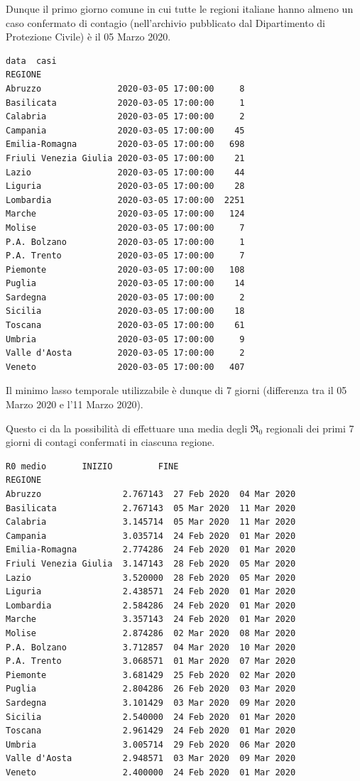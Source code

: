\documentclass[11pt]{article}
\begin{document}
    Dunque il primo giorno comune in cui tutte le regioni italiane hanno
almeno un caso confermato di contagio (nell'archivio pubblicato dal Dipartimento
di Protezione Civile) è il 05 Marzo 2020.

    
    \begin{Verbatim}[commandchars=\\\{\}]
                                     data  casi
REGIONE
Abruzzo               2020-03-05 17:00:00     8
Basilicata            2020-03-05 17:00:00     1
Calabria              2020-03-05 17:00:00     2
Campania              2020-03-05 17:00:00    45
Emilia-Romagna        2020-03-05 17:00:00   698
Friuli Venezia Giulia 2020-03-05 17:00:00    21
Lazio                 2020-03-05 17:00:00    44
Liguria               2020-03-05 17:00:00    28
Lombardia             2020-03-05 17:00:00  2251
Marche                2020-03-05 17:00:00   124
Molise                2020-03-05 17:00:00     7
P.A. Bolzano          2020-03-05 17:00:00     1
P.A. Trento           2020-03-05 17:00:00     7
Piemonte              2020-03-05 17:00:00   108
Puglia                2020-03-05 17:00:00    14
Sardegna              2020-03-05 17:00:00     2
Sicilia               2020-03-05 17:00:00    18
Toscana               2020-03-05 17:00:00    61
Umbria                2020-03-05 17:00:00     9
Valle d'Aosta         2020-03-05 17:00:00     2
Veneto                2020-03-05 17:00:00   407
    \end{Verbatim}

    Il minimo lasso temporale utilizzabile è dunque di 7 giorni (differenza
tra il 05 Marzo 2020 e l'11 Marzo 2020).

    
    Questo ci da la possibilità di effettuare una media degli \(\Re_0\)
regionali dei primi 7 giorni di contagi confermati in ciascuna regione.

    
    \begin{Verbatim}[commandchars=\\\{\}]
                       R0 medio       INIZIO         FINE
REGIONE
Abruzzo                2.767143  27 Feb 2020  04 Mar 2020
Basilicata             2.767143  05 Mar 2020  11 Mar 2020
Calabria               3.145714  05 Mar 2020  11 Mar 2020
Campania               3.035714  24 Feb 2020  01 Mar 2020
Emilia-Romagna         2.774286  24 Feb 2020  01 Mar 2020
Friuli Venezia Giulia  3.147143  28 Feb 2020  05 Mar 2020
Lazio                  3.520000  28 Feb 2020  05 Mar 2020
Liguria                2.438571  24 Feb 2020  01 Mar 2020
Lombardia              2.584286  24 Feb 2020  01 Mar 2020
Marche                 3.357143  24 Feb 2020  01 Mar 2020
Molise                 2.874286  02 Mar 2020  08 Mar 2020
P.A. Bolzano           3.712857  04 Mar 2020  10 Mar 2020
P.A. Trento            3.068571  01 Mar 2020  07 Mar 2020
Piemonte               3.681429  25 Feb 2020  02 Mar 2020
Puglia                 2.804286  26 Feb 2020  03 Mar 2020
Sardegna               3.101429  03 Mar 2020  09 Mar 2020
Sicilia                2.540000  24 Feb 2020  01 Mar 2020
Toscana                2.961429  24 Feb 2020  01 Mar 2020
Umbria                 3.005714  29 Feb 2020  06 Mar 2020
Valle d'Aosta          2.948571  03 Mar 2020  09 Mar 2020
Veneto                 2.400000  24 Feb 2020  01 Mar 2020
    \end{Verbatim}
\end{document}
